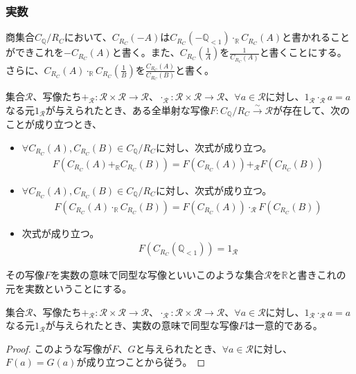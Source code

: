 \documentclass[dvipdfmx]{jsarticle}
\begin{document}
\subsubsection{実数}%
\begin{dfn}
商集合$C_{\mathbb{Q}} /R_{C} $において、$C_{R_{C}}( - A)$は$C_{R_{C}}\left( - \mathbb{Q}_{< 1} \right) \cdot_{\mathbb{R}}C_{R_{C}}(A)$と書かれることができこれを$- C_{R_{C}}(A)$と書く。また、$C_{R_{C}}\left( \frac{1}{A} \right)$を$\frac{1}{C_{R_{C}}(A)}$と書くことにする。さらに、$C_{R_{C}}(A) \cdot_{\mathbb{R}}C_{R_{C}}\left( \frac{1}{B} \right)$を$\frac{C_{R_{C}}(A)}{C_{R_{C}}(B)}$と書く。
\end{dfn}
\begin{dfn}
集合$\mathcal{R}$、写像たち$+_{\mathcal{R}}\mathcal{:R \times R \rightarrow R}$、$\cdot_{\mathcal{R}}\mathcal{:R \times R \rightarrow R}$、$\forall a\in \mathcal{R}$に対し、$1_{\mathcal{R}} \cdot_{\mathcal{R}}a = a$なる元$1_{\mathcal{R}}$が与えられたとき、ある全単射な写像$F:C_{\mathbb{Q}} /R_{C} \overset{\sim}{\rightarrow}\mathcal{R}$が存在して、次のことが成り立つとき、
\begin{itemize}
\item
  $\forall C_{R_{C}}(A),C_{R_{C}}(B) \in C_{\mathbb{Q}} /R_{C} $に対し、次式が成り立つ。
\begin{align*}
F\left( C_{R_{C}}(A) +_{\mathbb{R}}C_{R_{C}}(B) \right) = F\left( C_{R_{C}}(A) \right) +_{\mathcal{R}}F\left( C_{R_{C}}(B) \right)
\end{align*}
\item
  $\forall C_{R_{C}}(A),C_{R_{C}}(B) \in C_{\mathbb{Q}} /R_{C} $に対し、次式が成り立つ。
\begin{align*}
F\left( C_{R_{C}}(A) \cdot_{\mathbb{R}}C_{R_{C}}(B) \right) = F\left( C_{R_{C}}(A) \right) \cdot_{\mathcal{R}}F\left( C_{R_{C}}(B) \right)
\end{align*}
\item
  次式が成り立つ。
\begin{align*}
F\left( C_{R_{C}}\left( \mathbb{Q}_{< 1} \right) \right) = 1_{\mathcal{R}}
\end{align*}
\end{itemize}
その写像$F$を実数の意味で同型な写像といいこのような集合$\mathcal{R}$を$\mathbb{R}$と書きこれの元を実数ということにする。
\end{dfn}
\begin{thm}\label{1.2.6.41}
集合$\mathcal{R}$、写像たち$+_{\mathcal{R}}\mathcal{:R \times R \rightarrow R}$、$\cdot_{\mathcal{R}}\mathcal{:R \times R \rightarrow R}$、$\forall a\in \mathcal{R}$に対し、$1_{\mathcal{R}} \cdot_{\mathcal{R}}a = a$なる元$1_{\mathcal{R}}$が与えられたとき、実数の意味で同型な写像$F$は一意的である。
\end{thm}
\begin{proof}
このような写像が$F$、$G$と与えられたとき、$\forall a\in \mathcal{R}$に対し、$F(a) = G(a)$が成り立つことから従う。
\end{proof}
\end{document}
